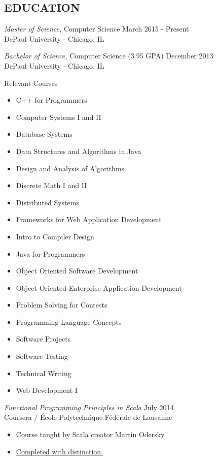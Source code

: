 \documentclass[margin]{res}
\begin{document}
\begin{resume}
\section{EDUCATION} 

  {\sl Master of Science,} Computer Science \hfill March 2015 - Present \\
  DePaul University - Chicago, IL 

  {\sl Bachelor of Science,} Computer Science (3.95 GPA) \hfill December 2013 \\
  DePaul University - Chicago, IL 
  \begin{multicols}{2} \centerline{Relevant Courses}
    \begin{itemize} \itemsep -2pt 
      \item C++ for Programmers
      \item Computer Systems I and II
      \item Database Systems
      \item Data Structures and Algorithms in Java
      \item Design and Analysis of Algorithms
      \item Discrete Math I and II
      \item Distributed Systems
      \item Frameworks for Web Application Development
      \item Intro to Compiler Design
      \item Java for Programmers
      \item Object Oriented Software Development
      \item Object Oriented Enterprise Application Development
      \item Problem Solving for Contests
      \item Programming Language Concepts
      \item Software Projects
      \item Software Testing
      \item Technical Writing
      \item Web Development I
    \end{itemize}
  \end{multicols}

  {\sl Functional Programming Principles in Scala} \hfill July 2014 \\
  Coursera / École Polytechnique Fédérale de Lausanne
  \begin{itemize} \itemsep -2pt 
    \item Course taught by Scala creator Martin Odersky.
    \item \href{https://github.com/mmcdon20/coursera/blob/master/Functional%20Programming%20Principles%202014.pdf?raw=true}{Completed with distinction.} 
  \end{itemize}



\end{resume}
\end{document}
